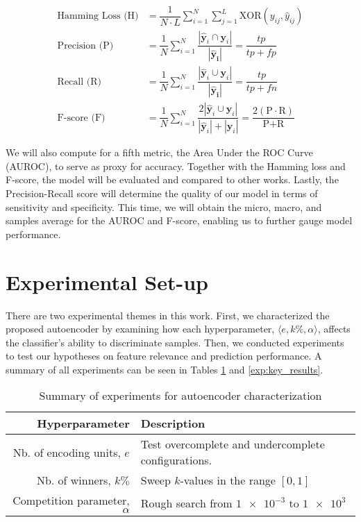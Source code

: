 \begin{align}
    \text{Hamming Loss (H)} &= \dfrac{1}{N \cdot L} \sum_{i=1}^{N} \sum_{j=1}^{L}
    \text{XOR}(y_{ij}, \widehat{y}_{ij}) \\
    \text{Precision (P)} &=
    \dfrac{1}{N}\sum_{i=1}^{N}\dfrac{|\mathbf{\widehat{y}}_{i} \cap
    \mathbf{y}_{i}|}{|\mathbf{\widehat{y}_{i}}|} = \dfrac{tp}{tp + fp} \\
    \text{Recall (R)} &=
    \dfrac{1}{N}\sum_{i=1}^{N}\dfrac{|\mathbf{\widehat{y}}_{i} \cup
    \mathbf{y}_{i}|}{|\mathbf{\widehat{y}_{i}}|} = \dfrac{tp}{tp + fn} \\
    \text{F-score (F)} &=
    \dfrac{1}{N}\sum_{i=1}^{N} \dfrac{2 | \mathbf{\widehat{y}}_{i} \cup
        \mathbf{y}_{i}|}{|\mathbf{\widehat{y}}_{i} | + |\mathbf{y}_{i}|} =
        \dfrac{2 (\text{P} \cdot \text{R})}{\text{P} +
        \text{R}}
\end{align}

\par We will also compute for a fifth metric, the Area Under the ROC Curve
(AUROC), to serve as proxy for accuracy. Together with the Hamming loss and
F-score, the model will be evaluated and compared to other works. Lastly, the
Precision-Recall score will determine the quality of our model in terms of
sensitivity and specificity. This time, we will obtain the micro, macro, and
samples average for the AUROC and F-score, enabling us to further gauge model
performance.

\section{Experimental Set-up}
\label{MCExperiments}

There are two experimental themes in this work. First, we characterized the
proposed autoencoder by examining how each hyperparameter, $\langle e, k\%,
\alpha \rangle$, affects the classifier's ability to discriminate samples.
Then, we conducted experiments to test our hypotheses on feature relevance and
prediction performance. A summary of all experiments can be seen in Tables
\ref{exp:hyperparameter} and \ref{exp:key_results}.

\begin{table}[!h]
  \centering
  \caption{Summary of experiments for autoencoder characterization}
  \label{exp:hyperparameter}
      \begin{tabular}{@{}rp{}@{}}
          \toprule
          Hyperparameter                      & Description \\ \midrule
          Nb. of encoding units, $e$    & Test overcomplete and undercomplete configurations.\\
          Nb. of winners, $k\%$     & Sweep $k$-values in the range $\left[ 0,1\right]$\\
          Competition parameter, $\alpha$ & Rough search from $\num{1e-3}$ to $\num{1e3}$\\ \bottomrule
      \end{tabular}
\end{table}

